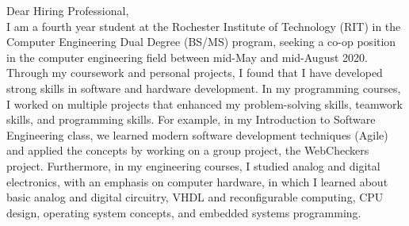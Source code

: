\documentclass[line,margin]{res}
\begin{document}
\setlength\columnsep{-30pt}
\email{} %
\phone{} %
\address{} %
\address{} %
\website{} %

	\begin{resume}
		\setlength
		\multicolsep{2pt}
		\begin{adjustwidth}{-92pt}{0pt}
		\vspace{10pt}

		\noindent
		Dear Hiring Professional, \\

		\noindent
		I am a fourth year student at the Rochester Institute of Technology (RIT) in the Computer Engineering Dual Degree (BS/MS) program, seeking a co-op position in the computer engineering field between mid-May and mid-August 2020. \\

		\noindent
		Through my coursework and personal projects, I found that I have developed strong skills in software and hardware development. In my programming courses, I worked on multiple projects that enhanced my problem-solving skills, teamwork skills, and programming skills. For example, in my Introduction to Software Engineering class, we learned modern software development techniques (Agile) and applied the concepts by working on a group project, the WebCheckers project. Furthermore, in my engineering courses, I studied analog and digital electronics, with an emphasis on computer hardware, in which I learned about basic analog and digital circuitry, VHDL and reconfigurable computing, CPU design, operating system concepts, and embedded systems programming. \\


\end{adjustwidth}
\end{resume}
\end{document}
